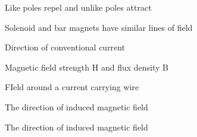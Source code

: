 \documentclass[compress]{beamer}
\begin{document}

{
    \begin{frame}{Like poles repel and unlike poles attract}
    \end{frame}
}



{
    \begin{frame}{Solenoid and bar magnets have similar lines of field}
    \end{frame}
}


{
    \begin{frame}{Direction of conventional current}
    \end{frame}
}


{
    \begin{frame}{Magnetic field strength H and flux density B}
    \end{frame}
}


{
    \begin{frame}{FIeld around a current carrying wire}
    \end{frame}
}


{
    \begin{frame}{The direction of induced magnetic field}
    \end{frame}
}


{
    \begin{frame}{The direction of induced magnetic field}
    \end{frame}
}

\end{document}

